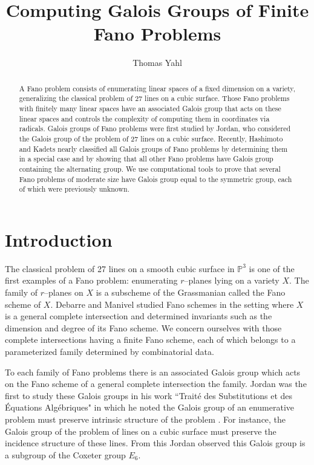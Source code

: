 \documentclass[12pt]{amsart}
\title{Computing Galois Groups of Finite Fano Problems}
\author[T.~Yahl]{Thomas Yahl}
\theoremstyle{definition}
\begin{document}
\begin{abstract}
A Fano problem consists of enumerating linear spaces of a fixed dimension on a variety, generalizing the classical problem of 27 lines on a cubic surface. Those Fano problems with finitely many linear spaces have an associated Galois group that acts on these linear spaces and controls the complexity of computing them in coordinates via radicals. Galois groups of Fano problems were first studied by Jordan, who considered the Galois group of the problem of 27 lines on a cubic surface. Recently, Hashimoto and Kadets nearly classified all Galois groups of Fano problems by determining them in a special case and by showing that all other Fano problems have Galois group containing the alternating group. We use computational tools to prove that several Fano problems of moderate size have Galois group equal to the symmetric group, each of which were previously unknown.
\end{abstract}



\maketitle

\section{Introduction}
The classical problem of 27 lines on a smooth cubic surface in $\mathbb{P}^3$ is one of the first examples of a Fano problem: enumerating $r$--planes lying on a variety $X$. The family of $r$--planes on $X$ is a subscheme of the Grassmanian called the Fano scheme of $X$. Debarre and Manivel studied Fano schemes in the setting where $X$ is a general complete intersection and determined invariants such as the dimension and degree of its Fano scheme. We concern ourselves with those complete intersections having a finite Fano scheme, each of which belongs to a parameterized family determined by combinatorial data.

To each family of Fano problems there is an associated Galois group which acts on the Fano scheme of a general complete intersection the family. Jordan was the first to study these Galois groups in his work  ``Trait\'{e} des Substitutions et des \'{E}quations Alg\'{e}briques" in which he noted the Galois group of an enumerative problem must preserve intrinsic structure of the problem \cite{Jordan}. For instance, the Galois group of the problem of lines on a cubic surface must preserve the incidence structure of these lines. From this Jordan observed this Galois group is a subgroup of the Coxeter group $E_6$.
\end{document}
